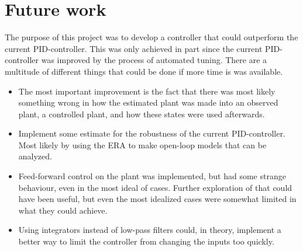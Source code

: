 \section{Future work}
The purpose of this project was to develop a controller that could outperform the current PID-controller. This was only achieved in part since the current PID-controller was improved by the process of automated tuning. 
There are a multitude of different things that could be done if more time is was available. 
\begin{itemize}
    \item The most important improvement is the fact that there was most likely something wrong in how the estimated plant was made into an observed plant, a controlled plant, and how these states were used afterwards. 
    \item Implement some estimate for the robustness of the current PID-controller. Most likely by using the ERA to make open-loop models that can be analyzed. 
    \item Feed-forward control on the plant was implemented, but had some strange behaviour, even in the most ideal of cases. Further exploration of that could have been useful, but even the most idealized cases were somewhat limited in what they could achieve. 
    \item Using integrators instead of low-pass filters could, in theory, implement a better way to limit the controller from changing the inputs too quickly. 
\end{itemize}

